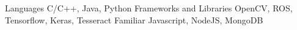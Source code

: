 \begin{cvhonors}
  \cvhonor
    {Languages}
    {C/C++, Java, Python}
    {}
    {}
  \cvhonor
    {Frameworks and Libraries}
    {OpenCV, ROS, Tensorflow, Keras, Tesseract}
    {}
    {}
    \cvhonor
    {Familiar}
    {Javascript, NodeJS, MongoDB}
    {}
    {}
\end{cvhonors}
